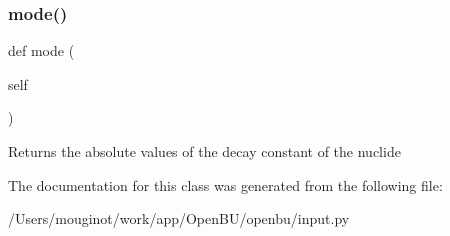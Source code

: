 \subsubsection{\texorpdfstring{mode()}{mode()}}
{\footnotesize\ttfamily def mode (\begin{DoxyParamCaption}\item[{}]{self }\end{DoxyParamCaption})}

\begin{DoxyVerb}Returns the absolute values of the decay constant of the nuclide\end{DoxyVerb}
 

The documentation for this class was generated from the following file\+:\begin{DoxyCompactItemize}
\item 
/\+Users/mouginot/work/app/\+Open\+B\+U/openbu/input.\+py\end{DoxyCompactItemize}
